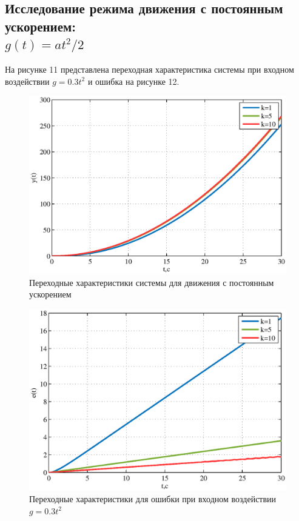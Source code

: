 \documentclass[a4paper,12pt]{article} %
\begin{document}
\subsection{Исследование режима движения с постоянным ускорением: \\$g(t)=at^2/2$} 
На рисунке 11 представлена переходная характеристика системы при входном воздействии $g=0.3t^2$ и ошибка на рисунке 12.
\begin{figure}[H]
	\centering
	\includegraphics[width=1\linewidth]{scheme/plot9.eps}
	\caption{Переходные характеристики системы для движения с постоянным ускорением}
\end{figure}
\begin{figure}[H]
	\centering
	\includegraphics[width=1\linewidth]{scheme/plot10.eps}
	\caption{Переходные характеристики для ошибки при входном воздействии $g=0.3t^2$}
\end{figure}
\end{document}
